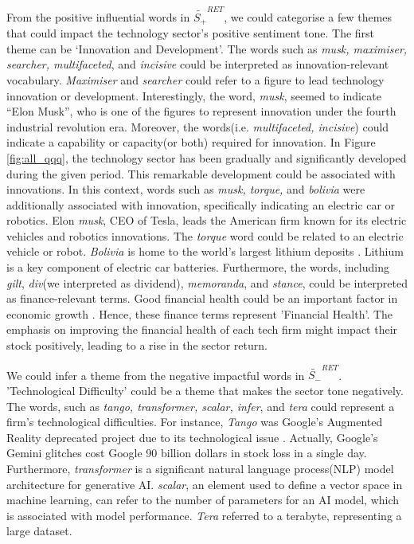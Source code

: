\documentclass[logo,bsc,singlespacing,parskip]{infthesis}
\begin{document}
From the positive influential words in $\tilde{S_{+}}^{RET} $, we could categorise a few themes that could impact the technology sector’s positive sentiment tone. The first theme can be ‘Innovation and Development’. The words such as \textit{musk, maximiser, searcher, multifaceted}, and \textit{incisive} could be interpreted as innovation-relevant vocabulary. \textit{Maximiser} and \textit{searcher} could refer to a figure to lead technology innovation or development. Interestingly, the word, \textit{musk}, seemed to indicate “Elon Musk”, who is one of the figures to represent innovation under the fourth industrial revolution era. Moreover, the words(i.e. \textit{multifaceted, incisive}) could indicate a capability or capacity(or both) required for innovation. In Figure \ref{fig:all_qqq}, the technology sector has been gradually and significantly developed during the given period. This remarkable development could be associated with innovations. In this context, words such as \textit{musk, torque,} and \textit{bolivia} were additionally associated with innovation, specifically indicating an electric car or robotics. Elon \textit{musk}, CEO of Tesla, leads the American firm known for its electric vehicles and robotics innovations. The \textit{torque} word could be related to an electric vehicle or robot. \textit{Bolivia} is home to the world’s largest lithium deposits \cite{chan2023global}. Lithium is a key component of electric car batteries. Furthermore, the words, including \textit{gilt}, \textit{div}(we interpreted as dividend), \textit{memoranda}, and \textit{stance}, could be interpreted as finance-relevant terms. Good financial health could be an important factor in economic growth \cite{koijen2016financial}. Hence, these finance terms represent 'Financial Health'. The emphasis on improving the financial health of each tech firm might impact their stock positively, leading to a rise in the sector return. 

We could infer a theme from the negative impactful words in $\tilde{S_{-}}^{RET} $. 'Technological Difficulty' could be a theme that makes the sector tone negatively. The words, such as \textit{tango, transformer, scalar, infer}, and \textit{tera} could represent a firm’s technological difficulties. For instance, \textit{Tango} was Google’s Augmented Reality deprecated project due to its technological issue \cite{kastrenakes2017google, donfro2017google}. Actually, Google’s Gemini glitches cost Google 90 billion dollars in stock loss in a single day. Furthermore, \textit{transformer} is a significant natural language process(NLP) model architecture for generative AI. \textit{scalar}, an element used to define a vector space in machine learning, can refer to the number of parameters for an AI model, which is associated with model performance. \textit{Tera} referred to a terabyte, representing a large dataset. 
\end{document}
